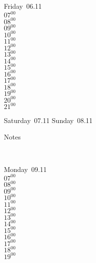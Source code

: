 \documentclass[11pt,a4paper]{book}\usepackage[]{graphicx}\usepackage[]{color}
\begin{document}
{{{{{{{{{{{{{{{{{{\begin{tcolorbox}
\end{tcolorbox} 
%
\begin{tcolorbox}
Friday~06.11\\
{ 
$07^{00}$\\
$08^{00}$\\
$09^{00}$\\
$10^{00}$\\
$11^{00}$\\
$12^{00}$\\
$13^{00}$\\
$14^{00}$\\
$15^{00}$\\
$16^{00}$\\
$17^{00}$\\
$18^{00}$\\
$19^{00}$\\
$20^{00}$\\
$21^{00}$}\\
\end{tcolorbox} 
%
\begin{tcolorbox}[height=(\textheight-10mm)/6]
Saturday~07.11
\tcblower
Sunday~08.11
\end{tcolorbox} %
%
\begin{tcolorbox}[height=(\textheight-10mm)/6,sidebyside=false]
Notes
\end{tcolorbox}
\clearpage
\vspace{2 mm}\\
%
%
\begin{tcolorbox}
Monday~09.11\\
{ 
$07^{00}$\\
$08^{00}$\\
$09^{00}$\\
$10^{00}$\\
$11^{00}$\\
$12^{00}$\\
$13^{00}$\\
$14^{00}$\\
$15^{00}$\\
$16^{00}$\\
$17^{00}$\\
$18^{00}$\\
$19^{00}$\\
}
\end{tcolorbox}}}}}}}}}}}}}}}}}}}
\end{document}
